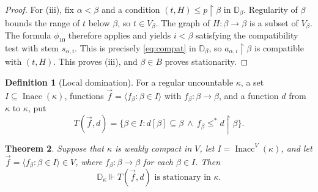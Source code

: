 \documentclass[10pt,a4paper]{amsart}
\newtheorem{theorem}{Theorem}[section]
\theoremstyle{definition}
\newtheorem{definition}[theorem]{Definition}
\theoremstyle{remark}
\newcommand{\D}{\mathbb D}
\DeclareMathOperator{\Inacc}{Inacc}
\begin{document}
\begin{proof}
For (iii), fix \(\alpha<\beta\) and a condition
\((t,H)\leq p\restriction\beta\) in \(\D_\beta\).
Regularity of \(\beta\) bounds the range of \(t\) below
\(\beta\), so \(t\in V_\beta\). The graph of
\(H:\beta\to\beta\) is a subset of \(V_\beta\). The formula \(\phi_{10}\)
therefore applies and yields \(i<\beta\) satisfying the
compatibility test with stem \(s_{\alpha,i}\). This is precisely
\eqref{eq:compat} in \(\D_\beta\), so
\(a_{\alpha,i}\restriction\beta\) is compatible with
\((t,H)\). This proves (iii), and \(\beta\in B\) proves
stationarity.
\end{proof}


\begin{definition}[Local domination]\label{def:domination}
For a regular uncountable \(\kappa\), a set
\(I\subseteq\Inacc(\kappa)\), functions
\(\vec f=\langle f_\beta:\beta\in I\rangle\) with
\(f_\beta:\beta\to\beta\), and a function \(d\) from \(\kappa\) to \(\kappa\), put
\[
 T(\vec f,d)=
 \{\beta\in I:d[\beta]\subseteq\beta
          \ \land\ f_\beta\leq^*d\restriction\beta\}.
\]
\end{definition}


\begin{theorem}\label{thm:domination}
Suppose that \(\kappa\) is weakly compact in \(V\), let
\(I=\Inacc^V(\kappa)\), and let
\(\vec f=\langle f_\beta:\beta\in I\rangle\in V\), where
\(f_\beta:\beta\to\beta\) for each \(\beta\in I\). Then
\[
 \D_\kappa\Vdash
 T(\vec f,d)\text{ is stationary in }\kappa.
\]
\end{theorem}
\end{document}
